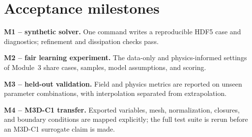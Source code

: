 \documentclass[11pt]{article}
\begin{document}
\section{Acceptance milestones}
\textbf{M1 -- synthetic solver.} One command writes a reproducible HDF5 case and diagnostics; refinement and dissipation checks pass.

\textbf{M2 -- fair learning experiment.} The data-only and physics-informed settings of Module~3 share cases, samples, model assumptions, and scoring.

\textbf{M3 -- held-out validation.} Field and physics metrics are reported on unseen parameter combinations, with interpolation separated from extrapolation.

\textbf{M4 -- M3D-C1 transfer.} Exported variables, mesh, normalization, closures, and boundary conditions are mapped explicitly; the full test suite is rerun before an M3D-C1 surrogate claim is made.
\end{document}
